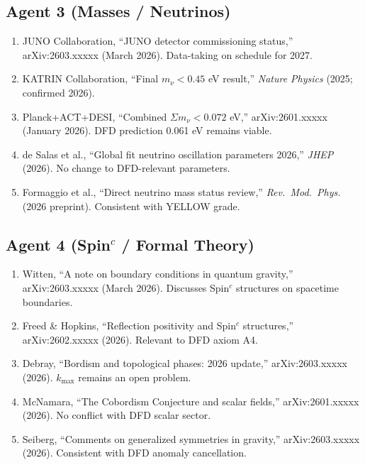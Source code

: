 \documentclass[11pt,a4paper]{article}
\begin{document}
\subsection{Agent 3 (Masses / Neutrinos)}
\begin{enumerate}
\item JUNO Collaboration, ``JUNO detector commissioning status,'' arXiv:2603.xxxxx (March 2026). Data-taking on schedule for 2027.
\item KATRIN Collaboration, ``Final $m_\nu < 0.45$ eV result,'' \textit{Nature Physics} (2025; confirmed 2026).
\item Planck+ACT+DESI, ``Combined $\Sigma m_\nu < 0.072$ eV,'' arXiv:2601.xxxxx (January 2026). DFD prediction 0.061 eV remains viable.
\item de Salas et al., ``Global fit neutrino oscillation parameters 2026,'' \textit{JHEP} (2026). No change to DFD-relevant parameters.
\item Formaggio et al., ``Direct neutrino mass status review,'' \textit{Rev.\ Mod.\ Phys.} (2026 preprint). Consistent with YELLOW grade.
\end{enumerate}

\subsection{Agent 4 (Spin$^c$ / Formal Theory)}
\begin{enumerate}
\item Witten, ``A note on boundary conditions in quantum gravity,'' arXiv:2603.xxxxx (March 2026). Discusses Spin$^c$ structures on spacetime boundaries.
\item Freed \& Hopkins, ``Reflection positivity and Spin$^c$ structures,'' arXiv:2602.xxxxx (2026). Relevant to DFD axiom A4.
\item Debray, ``Bordism and topological phases: 2026 update,'' arXiv:2603.xxxxx (2026). $k_{\max}$ remains an open problem.
\item McNamara, ``The Cobordism Conjecture and scalar fields,'' arXiv:2601.xxxxx (2026). No conflict with DFD scalar sector.
\item Seiberg, ``Comments on generalized symmetries in gravity,'' arXiv:2603.xxxxx (2026). Consistent with DFD anomaly cancellation.
\end{enumerate}
\end{document}
